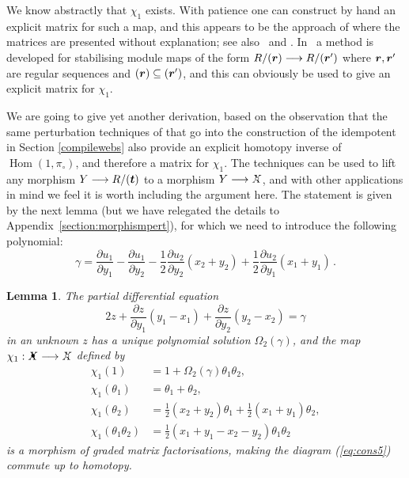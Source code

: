 \documentclass{compositio}
\newtheorem{lemma}[theorem]{Lemma}
\theoremstyle{definition}
\numberwithin{equation}{section}
\def\Hom{\operatorname{Hom}}
\begin{document}
We know abstractly that $\chi_1$ exists. With patience one can construct by hand an explicit matrix for such a map, and this appears to be the approach of \cite{kr0401268} where the matrices are presented without explanation; see also~\cite[Section 2]{kr0505056} and \cite[Example 2.3.7]{b1105.0702}. In~\cite[Section 7.5]{w0907.0695} a method is developed for stabilising module maps of the form $R/(\boldsymbol{r}) \longrightarrow R/(\boldsymbol{r}')$ where $\boldsymbol{r},\boldsymbol{r}'$ are regular sequences and $(\boldsymbol{r}) \subseteq (\boldsymbol{r}')$, and this can obviously be used to give an explicit matrix for $\chi_1$.

We are going to give yet another derivation, based on the observation that the same perturbation techniques of \cite{dm1102.2957} that go into the construction of the idempotent in Section \ref{compilewebs} also provide an explicit homotopy inverse of $\Hom(1,\pi_{\circ})$, and therefore a matrix for $\chi_1$. The techniques can be used to lift any morphism $Y \longrightarrow R/(\boldsymbol{t})$ to a morphism $Y \lto \Xcirc$, and with other applications in mind we feel it is worth including the argument here. The statement is given by the next lemma (but we have relegated the details to Appendix~\ref{section:morphismpert}), for which we need to introduce the following polynomial:
\[
\gamma = \frac{\partial u_1}{\partial y_1} - \frac{\partial u_1}{\partial y_2} - \frac{1}{2} \frac{\partial u_2}{\partial y_2}(x_2 + y_2) + \frac{1}{2} \frac{\partial u_2}{\partial y_1}(x_1 + y_1) \, .
\]
\begin{lemma}\label{lemma:consfirst} The partial differential equation 
\begin{equation}\label{eq:consfirst1}
2 z + \frac{\partial z}{\partial y_1} (y_1 - x_1) + \frac{\partial z}{\partial y_2}(y_2 - x_2) = \gamma
\end{equation}
in an unknown $z$ has a unique polynomial solution $\Omega_2(\gamma)$, and the map $\chi_1: \Xbul \lto \Xcirc$ defined by
\begin{align*}
\chi_1(1) &= 1 + \Omega_2( \gamma )\theta_1 \theta_2,\\
\chi_1(\theta_1) &= \theta_1 + \theta_2,\\
\chi_1(\theta_2) &= \frac{1}{2}(x_2 + y_2)\theta_1 + \frac{1}{2}(x_1 + y_1)\theta_2,\\
\chi_1(\theta_1\theta_2) &= \frac{1}{2}(x_1 + y_1 - x_2 - y_2) \theta_1\theta_2
\end{align*}
is a morphism of graded matrix factorisations, making the diagram (\ref{eq:cons5}) commute up to homotopy.
\end{lemma}
\end{document}
